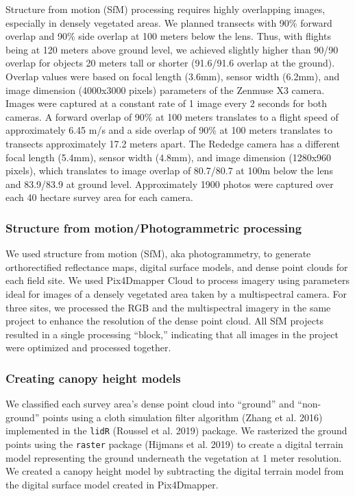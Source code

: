 \documentclass[]{article}
\begin{document}
Structure from motion (SfM) processing requires highly overlapping
images, especially in densely vegetated areas. We planned transects with
90\% forward overlap and 90\% side overlap at 100 meters below the lens.
Thus, with flights being at 120 meters above ground level, we achieved
slightly higher than 90/90 overlap for objects 20 meters tall or shorter
(91.6/91.6 overlap at the ground). Overlap values were based on focal
length (3.6mm), sensor width (6.2mm), and image dimension (4000x3000
pixels) parameters of the Zenmuse X3 camera. Images were captured at a
constant rate of 1 image every 2 seconds for both cameras. A forward
overlap of 90\% at 100 meters translates to a flight speed of
approximately 6.45 m/s and a side overlap of 90\% at 100 meters
translates to transects approximately 17.2 meters apart. The Rededge
camera has a different focal length (5.4mm), sensor width (4.8mm), and
image dimension (1280x960 pixels), which translates to image overlap of
80.7/80.7 at 100m below the lens and 83.9/83.9 at ground level.
Approximately 1900 photos were captured over each 40 hectare survey area
for each camera.

\subsubsection{Structure from motion/Photogrammetric
processing}\label{structure-from-motionphotogrammetric-processing}

We used structure from motion (SfM), aka photogrammetry, to generate
orthorectified reflectance maps, digital surface models, and dense point
clouds for each field site. We used Pix4Dmapper Cloud to process imagery
using parameters ideal for images of a densely vegetated area taken by a
multispectral camera. For three sites, we processed the RGB and the
multispectral imagery in the same project to enhance the resolution of
the dense point cloud. All SfM projects resulted in a single processing
``block,'' indicating that all images in the project were optimized and
processed together.

\subsubsection{Creating canopy height
models}\label{creating-canopy-height-models}

We classified each survey area's dense point cloud into ``ground'' and
``non-ground'' points using a cloth simulation filter algorithm (Zhang
et al. 2016) implemented in the \texttt{lidR} (Roussel et al. 2019)
package. We rasterized the ground points using the \texttt{raster}
package (Hijmans et al. 2019) to create a digital terrain model
representing the ground underneath the vegetation at 1 meter resolution.
We created a canopy height model by subtracting the digital terrain
model from the digital surface model created in Pix4Dmapper.
\end{document}

